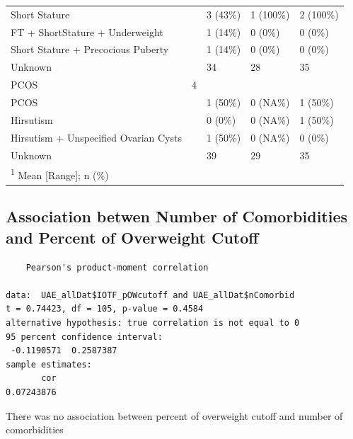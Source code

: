 \documentclass[
]{article}
\begin{document}
\begin{table}[!h]
\begin{tabular}[t]{lllll}
\hspace{1em}Short Stature &  & 3 (43\%) & 1 (100\%) & 2 (100\%)\\
\addlinespace
\hspace{1em}FT + ShortStature + Underweight &  & 1 (14\%) & 0 (0\%) & 0 (0\%)\\
\hspace{1em}Short Stature + Precocious Puberty &  & 1 (14\%) & 0 (0\%) & 0 (0\%)\\
\hspace{1em}Unknown &  & 34 & 28 & 35\\
PCOS & 4 &  &  & \\
\hspace{1em}PCOS &  & 1 (50\%) & 0 (NA\%) & 1 (50\%)\\
\addlinespace
\hspace{1em}Hirsutism &  & 0 (0\%) & 0 (NA\%) & 1 (50\%)\\
\hspace{1em}Hirsutism + Unspecified Ovarian Cysts &  & 1 (50\%) & 0 (NA\%) & 0 (0\%)\\
\hspace{1em}Unknown &  & 39 & 29 & 35\\
\bottomrule
\multicolumn{5}{l}{\rule{0pt}{1em}\textsuperscript{1} Mean [Range]; n (\%)}\\
\end{tabular}
\end{table}

\FloatBarrier

\hypertarget{association-betwen-number-of-comorbidities-and-percent-of-overweight-cutoff}{%
\subsection{Association betwen Number of Comorbidities and Percent of
Overweight
Cutoff}\label{association-betwen-number-of-comorbidities-and-percent-of-overweight-cutoff}}

\begin{verbatim}
    Pearson's product-moment correlation

data:  UAE_allDat$IOTF_pOWcutoff and UAE_allDat$nComorbid
t = 0.74423, df = 105, p-value = 0.4584
alternative hypothesis: true correlation is not equal to 0
95 percent confidence interval:
 -0.1190571  0.2587387
sample estimates:
       cor 
0.07243876 
\end{verbatim}

\FloatBarrier

There was no association between percent of overweight cutoff and number
of comorbidities
\end{document}
